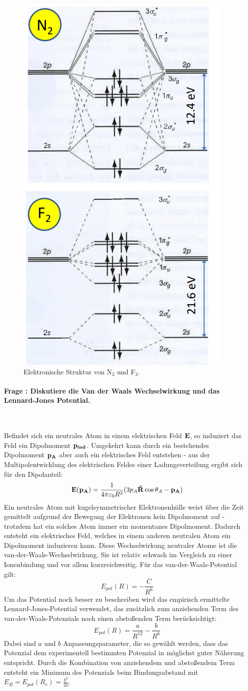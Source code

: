 \documentclass[a4paper, 11pt, ngerman, parskip=half-]{scrartcl}
\newcounter{question}
\newcommand{\question}[1]{\stepcounter{question}\paragraph{Frage \thequestion: #1}~}
\begin{document}
\begin{figure}[H]  
    \centering
    \includegraphics[width=.4\textwidth]{resources/24-03-2015/N2-F2.png}
    \caption{Elektronische Struktur von N$_2$ und F$_2$.}
    \label{fig:q52}
\end{figure}


\question{Diskutiere die Van der Waals Wechselwirkung und das Lennard-Jones Potential.}
\label{q:53}

Befindet sich ein neutrales Atom in einem elektrischen Feld $\vb{E}$, so induziert das Feld ein Dipolmoment $\vb{p_{ind}}$. Umgekehrt kann durch ein bestehendes Dipolmoment $\vb{p_A}$ aber auch ein elektrisches Feld entstehen - aus der Multipolentwicklung des elektrischen Feldes einer Ladungsverteilung ergibt sich für den Dipolanteil:
\begin{equation*}
    \vb{E}(\vb{p_A}) = \frac{1}{4\pi\varepsilon_0 R^3} (3 p_A \vb{\hat{R}} \cos{\theta_A} - \vb{p_A})
\end{equation*}
Ein neutrales Atom mit kugelsymmetrischer Elektronenhülle weist über die Zeit gemittelt aufgrund der Bewegung der Elektronen kein Dipolmoment auf - trotzdem hat ein solches Atom immer ein momentanes Dipolmoment. Dadurch entsteht ein elektrisches Feld, welches in einem anderen neutralen Atom ein Dipolmoment induzieren kann. Diese Wechselwirkung neutraler Atome ist die van-der-Waals-Wechselwirkung. Sie ist relativ schwach im Vergleich zu einer Ionenbindung und vor allem kurzreichweitig. Für das van-der-Waals-Potential gilt:
\begin{equation*}
    E_{pot}(R) = -\frac{C}{R^6}
\end{equation*}
Um das Potential noch besser zu beschreiben wird das empirisch ermittelte Lennard-Jones-Potential verwendet, das zusätzlich zum anziehenden Term des van-der-Waals-Potenzials noch einen abstoßenden Term berücksichtigt:
\begin{equation*}
    E_{pot}(R) = \frac{a}{R^{12}} - \frac{b}{R^6}
\end{equation*}
Dabei sind $a$ und $b$ Anpassungsparameter, die so gewählt werden, dass das Potenzial dem experimentell bestimmten Potenzial in möglichst guter Näherung entspricht. Durch die Kombination von anziehendem und abstoßendem Term entsteht ein Minimum des Potenzials beim Bindungsabstand mit $E_B = E_{pot}(R_e) = \frac{b^2}{2a}$.
\end{document}
